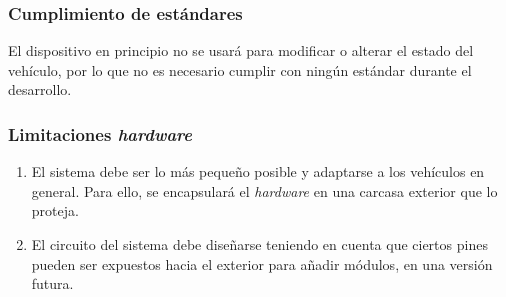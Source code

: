 \subsubsection{Cumplimiento de estándares}
El dispositivo en principio no se usará para modificar o alterar el estado del vehículo,
por lo que no es necesario cumplir con ningún estándar durante el desarrollo.

\subsubsection{Limitaciones \textit{hardware}}
\begin{enumerate}[resume, label=\textbf{\texttt{RNF-\arabic*}}]
  \item\label{nf:exterior} El sistema debe ser lo más pequeño posible y adaptarse
  a los vehículos en general. Para ello, se encapsulará el \textit{hardware} en
  una carcasa exterior que lo proteja.
  \item\label{nf:circuit} El circuito del sistema debe diseñarse teniendo en cuenta
  que ciertos pines pueden ser expuestos hacia el exterior para añadir módulos, en
  una versión futura.
\end{enumerate}